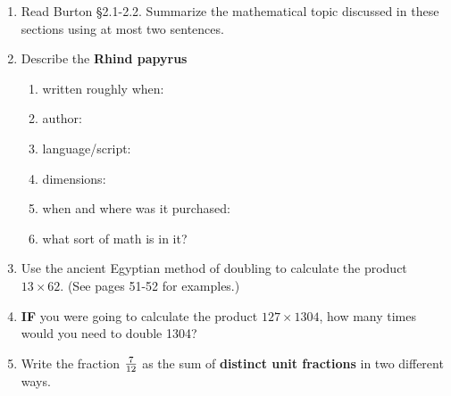 \documentclass[12pt]{article}
\renewcommand{\emph}[1]{\textsf{\textbf{#1}}}
\begin{document}
\begin{enumerate}
\item Read Burton \S 2.1-2.2. Summarize the mathematical topic discussed in these sections using at most two sentences.
\vspace{1in}
\item Describe the \emph{Rhind papyrus}
	\begin{enumerate}
	\item written roughly when:
	
	\item author:
	
	\item language/script: 
	
	\item dimensions: 
	
	\item when and where was it purchased:
	
	\item what sort of math is in it?
	
	\vfill
	\end{enumerate}
\item Use the ancient Egyptian method of doubling to calculate the product $13 \times 62.$ (See pages 51-52 for examples.)
\vspace{1.5in}
\item \textbf{IF} you were going to calculate the product $127 \times 1304$, how many times would you need to double 1304?
\vfill
\item Write the fraction $\large{\frac{7}{12}}$ as the sum of \emph{distinct unit fractions} in two different ways.
\vfill
\end{enumerate}
\end{document}
